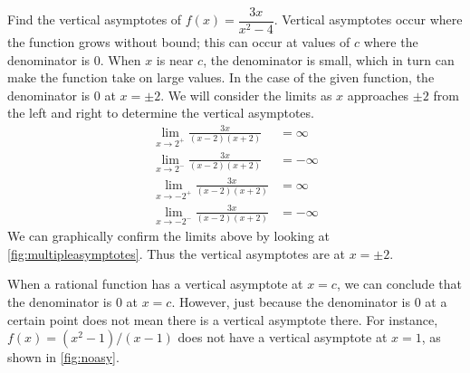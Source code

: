 \begin{example}\label{ex_vertasy1}%
Find the vertical asymptotes of $f(x)=\dfrac{3x}{x^2-4}$.
\solution
Vertical asymptotes occur where the function grows without bound; this can occur at values of $c$ where the denominator is 0. When $x$ is near $c$, the denominator is small, which in turn can make the function take on large values.  In the case of the given function, the denominator is 0 at $x=\pm 2$.  We will consider the limits as $x$ approaches $\pm 2$ from the left and right to determine the vertical asymptotes. \vspace{-.3\baselineskip}
%
%
%
\begin{align*}
\lim_{x\to  2^+}\frac{3x}{(x-2)(x+2)}&= \infty\\
\lim_{x\to  2^-}\frac{3x}{(x-2)(x+2)}&=-\infty\\
\lim_{x\to -2^+}\frac{3x}{(x-2)(x+2)}&= \infty\\
\lim_{x\to -2^-}\frac{3x}{(x-2)(x+2)}&=-\infty
\end{align*}
We can graphically confirm the limits above by looking at \autoref{fig:multipleasymptotes}. Thus the vertical asymptotes are at $x=\pm2$.
\end{example}

When a rational function has a vertical asymptote at $x=c$, we can conclude that the denominator is 0 at $x=c$. However, just because the denominator is 0 at a certain point does not mean there is a vertical asymptote there.  For instance, $f(x)=(x^2-1)/(x-1)$ does not have a vertical asymptote at $x=1$, as shown in \autoref{fig:noasy}. 

